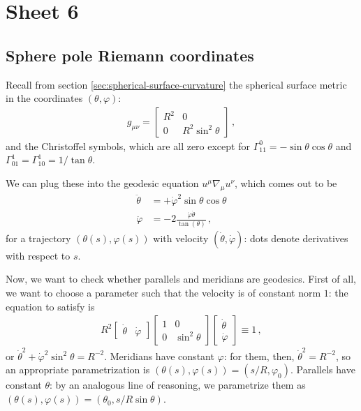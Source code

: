 \documentclass[main.tex]{subfiles}
\begin{document}
\section{Sheet 6}

\subsection{Sphere pole Riemann coordinates}

Recall from section \ref{sec:spherical-surface-curvature} the spherical surface metric in the coordinates \((\theta,  \varphi )\): 
%
\begin{align}
  g_{\mu \nu } = \left[\begin{array}{cc}
  R^2 & 0 \\ 
  0 & R^2 \sin^2 \theta 
  \end{array}\right]
\,,
\end{align}
%
and the Christoffel symbols, which are all zero except for \(\Gamma^{0}_{11}= - \sin \theta \cos \theta \) and \(\Gamma^{1}_{01} = \Gamma^{1}_{10} = 1/ \tan \theta \).

We can plug these into the geodesic equation \(u^{\mu } \nabla_{\mu } u^{\nu }\), which comes out to be 
%
\begin{subequations}
\begin{align}
  \ddot{\theta } &= + \dot{\varphi }^2 \sin \theta \cos \theta  \\
  \ddot{\varphi } &= - 2 \frac{\dot{\varphi } \dot{\theta } }{\tan(\theta )} 
\,,
\end{align}
\end{subequations}
%
for a trajectory \((\theta (s), \varphi (s))\) with velocity \((\dot{\theta }, \dot{\varphi })\): dots denote derivatives with respect to \(s\).

Now, we want to check whether parallels and meridians are geodesics. First of all, we want to choose a parameter such that the velocity is of constant norm \(1\): the equation to satisfy is 
%
\begin{align}
  R^2 \left[\begin{array}{cc}
  \dot{\theta} & \dot{\varphi}
  \end{array}\right]
  \left[\begin{array}{cc}
  1 & 0 \\ 
  0 & \sin^2 \theta 
  \end{array}\right]
  \left[\begin{array}{c}
  \dot{\theta} \\ 
  \dot{\varphi}
  \end{array}\right]
  \equiv 1
\,,
\end{align}
%
or \(\dot{\theta}^2 + \dot{\varphi}^2 \sin^2 \theta = R^{-2}\).
Meridians have constant \(\varphi \): for them, then, \(\dot{\theta}^2 = R^{-2} \), so an appropriate parametrization is \((\theta(s), \varphi(s)) = (s/R, \varphi_0 )\).
Parallels have constant \(\theta \): by an analogous line of reasoning, we parametrize them as \((\theta (s), \varphi (s) )= (\theta_0, s / R \sin\theta  )\). 
\end{document}
